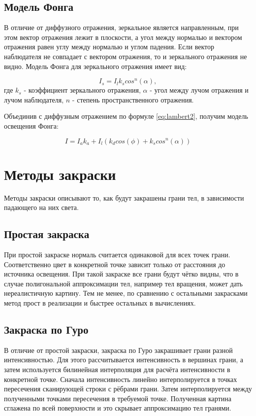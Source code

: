 \subsection{Модель Фонга}
В отличие от диффузного отражения, зеркальное является направленным, при этом вектор отражения лежит в плоскости, а угол между нормалью и вектором отражения равен углу между нормалью и углом падения. Если вектор наблюдателя не совпадает с вектором отражения, то и зеркального отражения не видно. Модель Фонга для зеркального отражения имеет вид:

\begin{equation}
	\label{eq:fong-reflection}
	I_s = I_{l}k_scos^n(\alpha),
\end{equation}
где $k_s$ - коэффициент зеркального отражения, $\alpha$ - угол между лучом отражения и лучом наблюдателя, $n$ - степень пространственного отражения.

Объединив с диффузным отражением по формуле \ref{eq:lambert2}, получим модель освещения Фонга:

\begin{equation}
	\label{eq:fong-model}
	I = I_ak_a + I_{l}(k_dcos(\phi) + k_scos^n(\alpha))
\end{equation}

\section{Методы закраски}
Методы закраски описывают то, как будут закрашены грани тел, в зависимости падающего на них света.

\subsection{Простая закраска}
При простой закраске нормаль считается одинаковой для всех точек грани. Соответственно цвет в конкретной точке зависит только от расстояния до источника освещения.
При такой закраске все грани будут чётко видны, что в случае полигональной аппроксимации тел, например тел вращения, может дать нереалистичную картину. Тем не менее, по сравнению с остальными закрасками метод прост в реализации и быстрее остальных в вычислениях.

\subsection{Закраска по Гуро}
В отличие от простой закраски, закраска по Гуро закрашивает грани разной интенсивностью. Для этого рассчитывается интенсивность в вершинах грани, а затем используется билинейная интерполяция для расчёта интенсивности в конкретной точке.
Сначала интенсивность линейно интерполируется в точках пересечения сканирующей строки с рёбрами грани. Затем интерполируется между полученными точками пересечения в требуемой точке. Полученная картина сглажена по всей поверхности и это скрывает аппроксимацию тел гранями.

